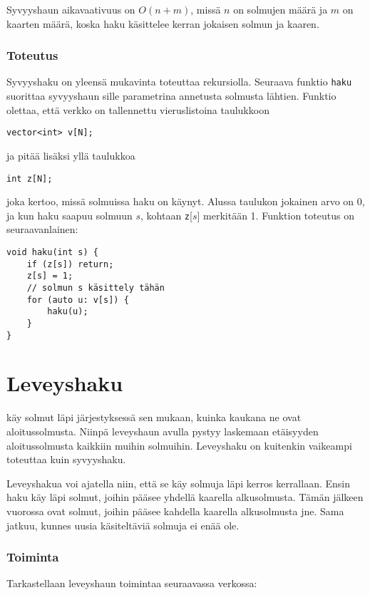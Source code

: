 Syvyyshaun aikavaativuus on $O(n+m)$,
missä $n$ on solmujen määrä ja $m$ on kaarten määrä,
koska haku käsittelee kerran jokaisen solmun ja kaaren.

\subsubsection*{Toteutus}

Syvyyshaku on yleensä mukavinta toteuttaa
rekursiolla.
Seuraava funktio \texttt{haku}
suorittaa syvyyshaun sille parametrina
annetusta solmusta lähtien.
Funktio olettaa, että
verkko on tallennettu vieruslistoina
taulukkoon
\begin{lstlisting}
vector<int> v[N];
\end{lstlisting}
ja pitää lisäksi yllä taulukkoa
\begin{lstlisting}
int z[N];
\end{lstlisting}
joka kertoo, missä solmuissa haku on käynyt.
Alussa taulukon jokainen arvo on 0,
ja kun haku saapuu solmuun $s$,
kohtaan \texttt{z}[$s$] merkitään 1.
Funktion toteutus on seuraavanlainen:
\begin{lstlisting}
void haku(int s) {
    if (z[s]) return;
    z[s] = 1;
    // solmun s käsittely tähän
    for (auto u: v[s]) {
        haku(u);
    }
}
\end{lstlisting}

\section{Leveyshaku}


käy solmut läpi järjestyksessä sen mukaan,
kuinka kaukana ne ovat aloitussolmusta.
Niinpä leveyshaun avulla pystyy laskemaan
etäisyyden aloitussolmusta kaikkiin
muihin solmuihin.
Leveyshaku on kuitenkin vaikeampi
toteuttaa kuin syvyyshaku.

Leveyshakua voi ajatella niin,
että se käy solmuja läpi kerros kerrallaan.
Ensin haku käy läpi solmut,
joihin pääsee yhdellä kaarella
alkusolmusta.
Tämän jälkeen vuorossa ovat
solmut, joihin pääsee kahdella
kaarella alkusolmusta jne.
Sama jatkuu, kunnes uusia käsiteltäviä
solmuja ei enää ole.

\subsubsection*{Toiminta}

Tarkastellaan leveyshaun toimintaa
seuraavassa verkossa:

